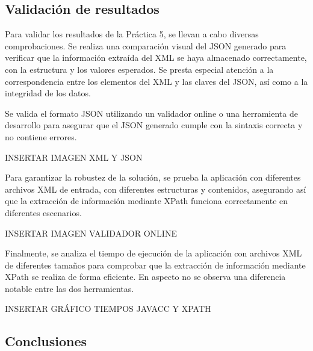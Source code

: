

\subsection{Validación de resultados}

Para validar los resultados de la Práctica 5, se llevan a cabo diversas comprobaciones. Se realiza una comparación visual del JSON generado para verificar que la información extraída del XML se haya almacenado correctamente, con la estructura y los valores esperados. Se presta especial atención a la correspondencia entre los elementos del XML y las claves del JSON, así como a la integridad de los datos.

Se valida el formato JSON utilizando un validador online o una herramienta de desarrollo para asegurar que el JSON generado cumple con la sintaxis correcta y no contiene errores.

INSERTAR IMAGEN XML Y JSON

Para garantizar la robustez de la solución, se prueba la aplicación con diferentes archivos XML de entrada, con diferentes estructuras y contenidos, asegurando así que la extracción de información mediante XPath funciona correctamente en diferentes escenarios.

INSERTAR IMAGEN VALIDADOR ONLINE

Finalmente, se analiza el tiempo de ejecución de la aplicación con archivos XML de diferentes tamaños para comprobar que la extracción de información mediante XPath se realiza de forma eficiente. En aspecto no se observa una diferencia notable entre las dos herramientas.

INSERTAR GRÁFICO TIEMPOS JAVACC Y XPATH

\subsection{Conclusiones}

